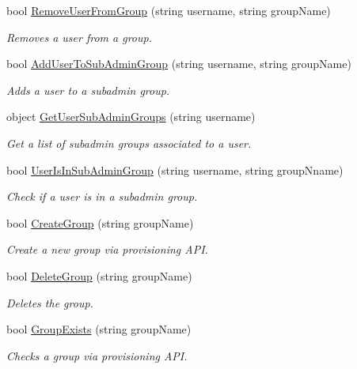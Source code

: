 \begin{DoxyCompactItemize}
bool \hyperlink{classowncloudsharp_1_1_client_a8c2bcb8ca08d661bb4c15b8cc07eaf5d}{Remove\+User\+From\+Group} (string username, string group\+Name)
\begin{DoxyCompactList}\small\item\em Removes a user from a group. \end{DoxyCompactList}\item 
bool \hyperlink{classowncloudsharp_1_1_client_a99a393c20b57e50c10ee337b09ed75b3}{Add\+User\+To\+Sub\+Admin\+Group} (string username, string group\+Name)
\begin{DoxyCompactList}\small\item\em Adds a user to a subadmin group. \end{DoxyCompactList}\item 
object \hyperlink{classowncloudsharp_1_1_client_aef2ea7c0321e3094867f456df6929e47}{Get\+User\+Sub\+Admin\+Groups} (string username)
\begin{DoxyCompactList}\small\item\em Get a list of subadmin groups associated to a user. \end{DoxyCompactList}\item 
bool \hyperlink{classowncloudsharp_1_1_client_aa3e28e78df6a8e1ddb2f92fa2b1929c5}{User\+Is\+In\+Sub\+Admin\+Group} (string username, string group\+Nname)
\begin{DoxyCompactList}\small\item\em Check if a user is in a subadmin group. \end{DoxyCompactList}\item 
bool \hyperlink{classowncloudsharp_1_1_client_ae3f6b18765fa47eed193eae4db94ae2c}{Create\+Group} (string group\+Name)
\begin{DoxyCompactList}\small\item\em Create a new group via provisioning A\+P\+I. \end{DoxyCompactList}\item 
bool \hyperlink{classowncloudsharp_1_1_client_a83390a9710020ecc7513dd03a23e192f}{Delete\+Group} (string group\+Name)
\begin{DoxyCompactList}\small\item\em Deletes the group. \end{DoxyCompactList}\item 
bool \hyperlink{classowncloudsharp_1_1_client_a0eb9c35f345906e16175605b0cc08ade}{Group\+Exists} (string group\+Name)
\begin{DoxyCompactList}\small\item\em Checks a group via provisioning A\+P\+I. \end{DoxyCompactList}\item 

\end{DoxyCompactItemize}
